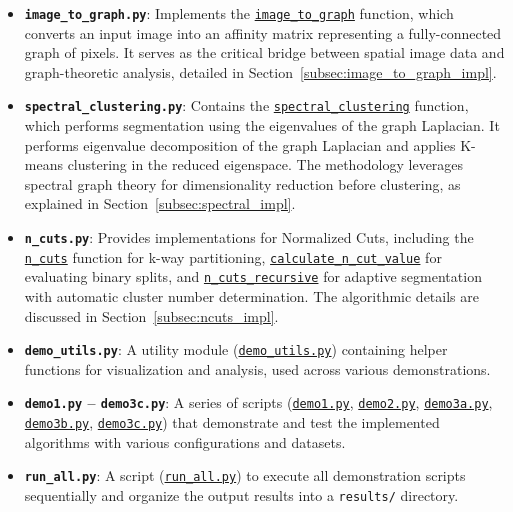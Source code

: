 \documentclass[12pt,a4paper]{article}
\begin{document}
\begin{itemize}
    
    \item \textbf{\texttt{image\_to\_graph.py}}: Implements the \href{Code/image_to_graph.py}{\texttt{image\_to\_graph}} function, which converts an input image into an affinity matrix representing a fully-connected graph of pixels. It serves as the critical bridge between spatial image data and graph-theoretic analysis, detailed in Section~\ref{subsec:image_to_graph_impl}.
    
    \item \textbf{\texttt{spectral\_clustering.py}}: Contains the \href{Code/spectral_clustering.py}{\texttt{spectral\_clustering}} function, which performs segmentation using the eigenvalues of the graph Laplacian. It performs eigenvalue decomposition of the graph Laplacian and applies K-means clustering in the reduced eigenspace. The methodology leverages spectral graph theory for dimensionality reduction before clustering, as explained in Section~\ref{subsec:spectral_impl}.
    
    \item \textbf{\texttt{n\_cuts.py}}: Provides implementations for Normalized Cuts, including the \href{Code/n_cuts.py}{\texttt{n\_cuts}} function for k-way partitioning, \href{Code/n_cuts.py}{\texttt{calculate\_n\_cut\_value}} for evaluating binary splits, and \href{Code/n_cuts.py}{\texttt{n\_cuts\_recursive}} for adaptive segmentation  with automatic cluster number determination. The algorithmic details are discussed in Section~\ref{subsec:ncuts_impl}.
    
    \item \textbf{\texttt{demo\_utils.py}}: A utility module (\href{Code/demo_utils.py}{\texttt{demo\_utils.py}}) containing helper functions for visualization and analysis, used across various demonstrations.
    
    \item \textbf{\texttt{demo1.py} -- \texttt{demo3c.py}}: A series of scripts (\href{Code/demo1.py}{\texttt{demo1.py}}, \href{Code/demo2.py}{\texttt{demo2.py}}, \href{Code/demo3a.py}{\texttt{demo3a.py}}, \href{Code/demo3b.py}{\texttt{demo3b.py}}, \href{Code/demo3c.py}{\texttt{demo3c.py}}) that demonstrate and test the implemented algorithms with various configurations and datasets.
    
    \item \textbf{\texttt{run\_all.py}}: A script (\href{Code/run_all.py}{\texttt{run\_all.py}}) to execute all demonstration scripts sequentially and organize the output results into a \texttt{results/} directory.

\end{itemize}
\end{document}
